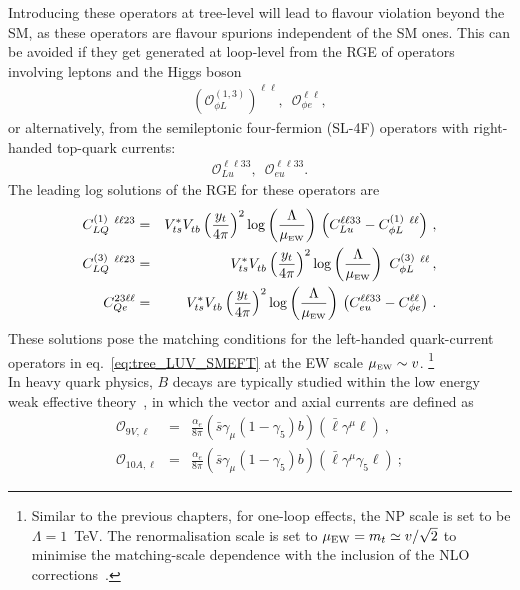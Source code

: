 Introducing these operators at tree-level will lead to flavour violation beyond the SM, as these operators are flavour spurions independent of the SM ones. This can be avoided if they get generated at loop-level from the RGE of operators involving leptons and the Higgs boson~\cite{Celis:2017doq} 
\begin{eqnarray} 
	\label{eq:SMEFT_op_HL}
	(	\mathcal{O}_{\phi L}^{(1,3)})^{\ell \ell},	\,\,\, 	\mathcal{O}_{\phi e}^{\ell \ell},
\end{eqnarray}
or alternatively, from the semileptonic four-fermion (SL-4F) operators with right-handed top-quark currents:
\begin{eqnarray} 
	\label{eq:SMEFT_op_loop_lu}
	\mathcal{O}_{Lu}^{\ell \ell 3 3}, \,	\,\,	\mathcal{O}_{eu}^{\ell \ell 3 3} .
\end{eqnarray}
The leading log solutions of the RGE for these operators are~\cite{Jenkins:2013zja,Jenkins:2013wua}
\begin{eqnarray}
	\label{eq:SMEFT_matching_1loop}
	C_{LQ}^{(1)}\ ^{\ell \ell 23} &=& V_{ts}^{*} V^{ }_{tb} \left(\frac{y_{t} }{4 \pi}\right)^2 \log \left( \frac{\Lambda}{\mu_{\textrm{\tiny{EW}}}} \right)   \, \left(C_{Lu}^{\ell \ell 3 3} - C_{\phi L}^{(1)}\ ^{\ell \ell} \right)\,,\nonumber \\
	C_{LQ}^{(3)}\ ^{\ell \ell 23} &=& V_{ts}^{*} V^{ }_{tb} \left(\frac{y_{t} }{4 \pi}\right)^2 \log \left( \frac{\Lambda}{\mu_{\textrm{\tiny{EW}}}} \right)  \ C_{\phi L}^{(3)}\ ^{\ell \ell}  \,,\nonumber \\
	C_{Qe}^{23\ell \ell} &=& V_{ts}^{*} V^{ }_{tb} \left(\frac{y_{t} }{4 \pi}\right)^2 \log \left( \frac{\Lambda}{\mu_{\textrm{\tiny{EW}}}} \right)   \, \left( C_{eu}^{\ell \ell 3 3} - C^{\ell \ell}_{\phi e}\right) \, .
\end{eqnarray}
 These solutions pose the matching conditions for the left-handed quark-current operators in eq.~\eqref{eq:tree_LUV_SMEFT} at the EW scale $\mu_{\textrm{\tiny{EW}}}\sim v$. \footnote{Similar to the previous chapters, for one-loop effects,  the NP scale is set to be $\Lambda = 1$~TeV.  The renormalisation scale is set to $\mu_{\rm EW} = m_t\simeq v/\sqrt{2}$ to minimise the matching-scale dependence with the inclusion of the NLO corrections~\cite{Aebischer:2015fzz,Bobeth:2017xry}.}\\
In heavy quark physics, $B$ decays are typically studied within the low energy weak effective theory~\cite{Buchalla:1995vs,Buras:1998raa,Silvestrini:2019sey}, in which the vector and axial currents are defined as
\begin{eqnarray}
	\label{eq:_Q9_Q10}
	\mathcal{O}_{9 V, \ell} & = & \frac{\alpha_{e}}{8 \pi} (\bar{s} \gamma_{\mu} (1-\gamma_{5})b) ( \bar{\ell} \gamma^{\mu} \ell ) \nonumber \ , \ \\
	\mathcal{O}_{10 A, \ell} & = & \frac{\alpha_{e}}{8 \pi} (\bar{s} \gamma_{\mu} (1-\gamma_{5})b) ( \bar{\ell} \gamma^{\mu} \gamma_{5} \ell ) \ ;
\end{eqnarray}
